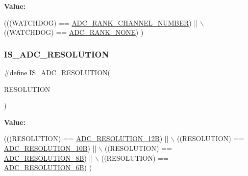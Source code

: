 {\bfseries Value\+:}
\begin{DoxyCode}
(((WATCHDOG) == \hyperlink{group___a_d_c__rank_ga25907c7d81b72261eff9adc6e9726690}{ADC\_RANK\_CHANNEL\_NUMBER}) || \(\backslash\)
                               ((WATCHDOG) == \hyperlink{group___a_d_c__rank_gace464dc0c5d9a401d2842f7f1629d5cd}{ADC\_RANK\_NONE})             )
\end{DoxyCode}
\mbox{\label{group___a_d_c___private___macros_ga346d83dd4af81b36a6dbd78c7bf2ff0a}} 
\subsubsection{\texorpdfstring{I\+S\+\_\+\+A\+D\+C\+\_\+\+R\+E\+S\+O\+L\+U\+T\+I\+ON}{IS\_ADC\_RESOLUTION}}
{\footnotesize\ttfamily \#define I\+S\+\_\+\+A\+D\+C\+\_\+\+R\+E\+S\+O\+L\+U\+T\+I\+ON(\begin{DoxyParamCaption}\item[{}]{R\+E\+S\+O\+L\+U\+T\+I\+ON }\end{DoxyParamCaption})}

{\bfseries Value\+:}
\begin{DoxyCode}
(((RESOLUTION) == \hyperlink{group___a_d_c___resolution_ga49c8408a1cdbf97bbf29234c3770fa74}{ADC\_RESOLUTION\_12B}) || \(\backslash\)
                                       ((RESOLUTION) == \hyperlink{group___a_d_c___resolution_ga91289e269eb3080d25301909c0f417e5}{ADC\_RESOLUTION\_10B}) || \(\backslash\)
                                       ((RESOLUTION) == \hyperlink{group___a_d_c___resolution_ga39925af93719877bdcc5664e4b95e69a}{ADC\_RESOLUTION\_8B})  || \(\backslash\)
                                       ((RESOLUTION) == \hyperlink{group___a_d_c___resolution_ga24c5226e05db78b4065f2f187d497b04}{ADC\_RESOLUTION\_6B})    )
\end{DoxyCode}
\mbox{\label{group___a_d_c___private___macros_ga30e0307fa009e1c383d3047b48e94644}} 
